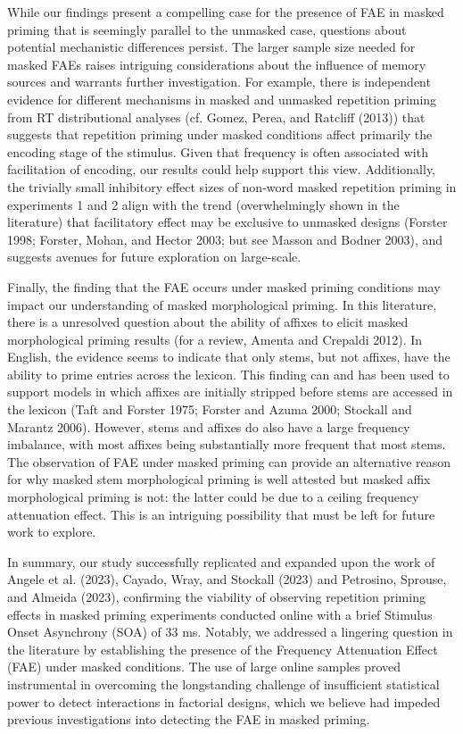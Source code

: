 \documentclass[
]{interact}
\begin{document}
While our findings present a compelling case for the presence of FAE in
masked priming that is seemingly parallel to the unmasked case,
questions about potential mechanistic differences persist. The larger
sample size needed for masked FAEs raises intriguing considerations
about the influence of memory sources and warrants further
investigation. For example, there is independent evidence for different
mechanisms in masked and unmasked repetition priming from RT
distributional analyses (cf. Gomez, Perea, and Ratcliff (2013)) that
suggests that repetition priming under masked conditions affect
primarily the encoding stage of the stimulus. Given that frequency is
often associated with facilitation of encoding, our results could help
support this view. Additionally, the trivially small inhibitory effect
sizes of non-word masked repetition priming in experiments 1 and 2 align
with the trend (overwhelmingly shown in the literature) that
facilitatory effect may be exclusive to unmasked designs (Forster 1998;
Forster, Mohan, and Hector 2003; but see Masson and Bodner 2003), and
suggests avenues for future exploration on large-scale.

Finally, the finding that the FAE occurs under masked priming conditions
may impact our understanding of masked morphological priming. In this
literature, there is a unresolved question about the ability of affixes
to elicit masked morphological priming results (for a review, Amenta and
Crepaldi 2012). In English, the evidence seems to indicate that only
stems, but not affixes, have the ability to prime entries across the
lexicon. This finding can and has been used to support models in which
affixes are initially stripped before stems are accessed in the lexicon
(Taft and Forster 1975; Forster and Azuma 2000; Stockall and Marantz
2006). However, stems and affixes do also have a large frequency
imbalance, with most affixes being substantially more frequent that most
stems. The observation of FAE under masked priming can provide an
alternative reason for why masked stem morphological priming is well
attested but masked affix morphological priming is not: the latter could
be due to a ceiling frequency attenuation effect. This is an intriguing
possibility that must be left for future work to explore.

In summary, our study successfully replicated and expanded upon the work
of Angele et al. (2023), Cayado, Wray, and Stockall (2023) and
Petrosino, Sprouse, and Almeida (2023), confirming the viability of
observing repetition priming effects in masked priming experiments
conducted online with a brief Stimulus Onset Asynchrony (SOA) of 33 ms.
Notably, we addressed a lingering question in the literature by
establishing the presence of the Frequency Attenuation Effect (FAE)
under masked conditions. The use of large online samples proved
instrumental in overcoming the longstanding challenge of insufficient
statistical power to detect interactions in factorial designs, which we
believe had impeded previous investigations into detecting the FAE in
masked priming.
\end{document}
